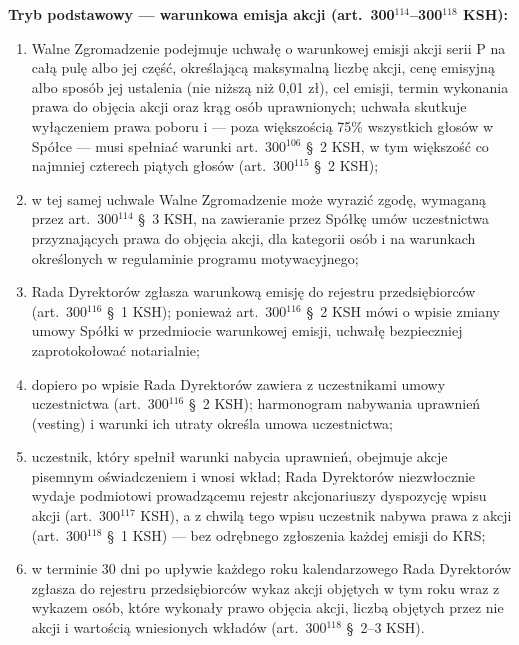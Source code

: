 \documentclass[12pt,a4paper]{report}
\begin{document}
\textbf{Tryb podstawowy --- warunkowa emisja akcji (art.~300$^{114}$--300$^{118}$ KSH):}
\begin{enumerate}
  \item Walne Zgromadzenie podejmuje uchwałę o warunkowej emisji akcji serii P na całą pulę albo jej część, określającą maksymalną liczbę akcji, cenę emisyjną albo sposób jej ustalenia (nie niższą niż 0,01 zł), cel emisji, termin wykonania prawa do objęcia akcji oraz krąg osób uprawnionych; uchwała skutkuje wyłączeniem prawa poboru i --- poza większością 75\% wszystkich głosów w Spółce --- musi spełniać warunki art.~300$^{106}$ §~2 KSH, w tym większość co najmniej czterech piątych głosów (art.~300$^{115}$ §~2 KSH);
  \item w tej samej uchwale Walne Zgromadzenie może wyrazić zgodę, wymaganą przez art.~300$^{114}$ §~3 KSH, na zawieranie przez Spółkę umów uczestnictwa przyznających prawa do objęcia akcji, dla kategorii osób i na warunkach określonych w regulaminie programu motywacyjnego;
  \item Rada Dyrektorów zgłasza warunkową emisję do rejestru przedsiębiorców (art.~300$^{116}$ §~1 KSH); ponieważ art.~300$^{116}$ §~2 KSH mówi o wpisie zmiany umowy Spółki w przedmiocie warunkowej emisji, uchwałę bezpieczniej zaprotokołować notarialnie;
  \item dopiero po wpisie Rada Dyrektorów zawiera z uczestnikami umowy uczestnictwa (art.~300$^{116}$ §~2 KSH); harmonogram nabywania uprawnień (vesting) i warunki ich utraty określa umowa uczestnictwa;
  \item uczestnik, który spełnił warunki nabycia uprawnień, obejmuje akcje pisemnym oświadczeniem i wnosi wkład; Rada Dyrektorów niezwłocznie wydaje podmiotowi prowadzącemu rejestr akcjonariuszy dyspozycję wpisu akcji (art.~300$^{117}$ KSH), a z chwilą tego wpisu uczestnik nabywa prawa z akcji (art.~300$^{118}$ §~1 KSH) --- bez odrębnego zgłoszenia każdej emisji do KRS;
  \item w terminie 30 dni po upływie każdego roku kalendarzowego Rada Dyrektorów zgłasza do rejestru przedsiębiorców wykaz akcji objętych w tym roku wraz z wykazem osób, które wykonały prawo objęcia akcji, liczbą objętych przez nie akcji i wartością wniesionych wkładów (art.~300$^{118}$ §~2--3 KSH).
\end{enumerate}
\end{document}
